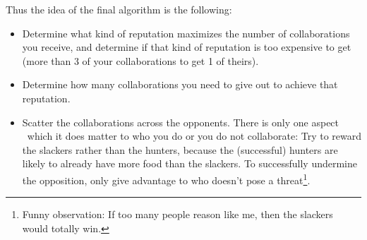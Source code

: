 \documentclass[10pt,fleqn]{article}
\begin{document}
Thus the idea of the final algorithm is the following:
\begin{itemize}
  \item Determine what kind of reputation maximizes the number of collaborations
  you receive, and determine if that kind of reputation is too expensive to get
  (more than 3 of your collaborations to get 1 of theirs).
  \item Determine how many collaborations you need to give out to achieve that
  reputation.
  \item Scatter the collaborations across the opponents. There is only one
  aspect \wrt\ which it does matter to who you do or you do not collaborate: Try
  to reward the slackers rather than the hunters, because the (successful)
  hunters are likely to already have more food than the slackers. To
  successfully undermine the opposition, only give advantage to who doesn't pose
  a threat\footnote{Funny observation: If too many people reason like me,
  then the slackers would totally win.}.
\end{itemize}
\end{document}

